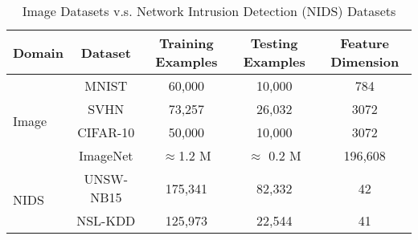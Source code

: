 \begin{table}[ht]
    \centering
    \caption[Network Intrusion Detection Datasets]{Image Datasets v.s. Network Intrusion Detection (NIDS) Datasets}
    \label{CDL:Tab:Datasets}
    \begin{tabular}{lcccc}
        \hline
        \hline
        \multicolumn{1}{l}{Domain}                          & Dataset       & Training Examples & Testing Examples & Feature Dimension  \\
        \hline
        \multirow{4}{*}{Image}                              & MNIST         & 60,000            & 10,000           & 784                \\
                                                            & SVHN          & 73,257            & 26,032           & 3072               \\
                                                            & CIFAR-10      & 50,000            & 10,000           & 3072               \\
                                                            & ImageNet      & $\approx$1.2 M    & $\approx$ 0.2 M  & 196,608            \\
        \cline{1-2}
        \multicolumn{1}{l}{\multirow{2}{*}{NIDS}}           & UNSW-NB15     & 175,341           & 82,332            & 42                \\
        \multicolumn{1}{l}{}                                & NSL-KDD       & 125,973           & 22,544            & 41                \\
        \hline
    \end{tabular}
\end{table}

